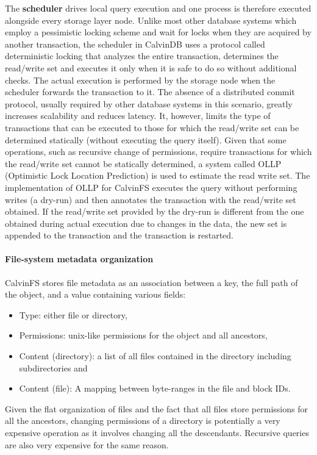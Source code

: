 The \textbf{scheduler} drives local query execution and one process is therefore executed alongside every storage layer node.
Unlike most other database systems which employ a pessimistic locking scheme and wait for locks when they are acquired by another transaction, the scheduler in CalvinDB uses a protocol called deterministic locking that analyzes the entire transaction, determines the read/write set and executes it only when it is safe to do so without additional checks.
The actual execution is performed by the storage node when the scheduler forwards the transaction to it.
The absence of a distributed commit protocol, usually required by other database systems in this scenario, greatly increases scalability and reduces latency.
It, however, limits the type of transactions that can be executed to those for which the read/write set can be determined statically (without executing the query itself).
Given that some operations, such as recursive change of permissions, require transactions for which the read/write set cannot be statically determined, a system called OLLP (Optimistic Lock Location Prediction) is used to estimate the read write set.
The implementation of OLLP for CalvinFS executes the query without performing writes (a dry-run) and then annotates the transaction with the read/write set obtained.
If the read/write set provided by the dry-run is different from the one obtained during actual execution due to changes in the data, the new set is appended to the transaction and the transaction is restarted.

\paragraph{File-system metadata organization} CalvinFS stores file metadata as an association between a key, the full path of the object, and a value containing various fields: \begin{itemize}
    \item Type: either file or directory,
    \item Permissions: unix-like permissions for the object and all ancestors,
    \item Content (directory): a list of all files contained in the directory including subdirectories and
    \item Content (file): A mapping between byte-ranges in the file and block IDs.
\end{itemize}

Given the flat organization of files and the fact that all files store permissions for all the ancestors, changing permissions of a directory is potentially a very expensive operation as it involves changing all the descendants.
Recursive queries are also very expensive for the same reason.

